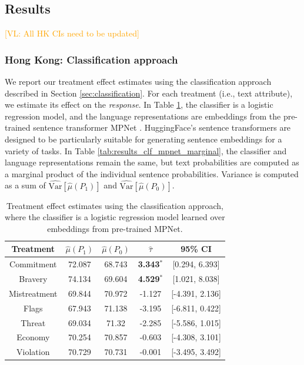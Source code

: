 \documentclass{article}
\newcommand{\vl}[1]{\textcolor{orange}{[VL: #1]}}
\begin{document}
\subsection{Results}

\vl{All HK CIs need to be updated}

\subsubsection{Hong Kong: Classification approach}

We report our treatment effect estimates using the classification approach described in Section \ref{sec:classification}. For each treatment (i.e., text attribute), we estimate its effect on the \textit{response}. In Table \ref{tab:results_clf_mpnet}, the classifier is a logistic regression model, and the language representations are embeddings from the pre-trained sentence transformer MPNet \cite{song2020mpnet}. HuggingFace's sentence transformers are designed to be particularly suitable for generating sentence embeddings for a variety of tasks. In Table \ref{tab:results_clf_mpnet_marginal}, the classifier and language representations remain the same, but text probabilities are computed as a marginal product of the individual sentence probabilities. Variance is computed as a sum of $\widehat{\text{Var}}[\hat{\mu}(P_1)]$ and $\widehat{\text{Var}}[\hat{\mu}(P_0)]$.

\begin{table}[!ht]
    \centering
    \begin{tabular}{c|cccc}
        \toprule
        Treatment & $\hat{\mu}(P_1)$ & $\hat{\mu}(P_0)$ & $\hat{\tau}$ & 95\% CI \\
        \midrule
        Commitment & 72.087 & 68.743 & \textbf{\textcolor{green!50!black}{3.343$^*$}} & [0.294, 6.393] \\
        Bravery & 74.134 & 69.604 & \textbf{\textcolor{green!50!black}{4.529$^*$}} & [1.021, 8.038] \\
        Mistreatment & 69.844 & 70.972 & \textcolor{red!80!black}{-1.127} & [-4.391, 2.136] \\
        Flags & 67.943 & 71.138 & \textcolor{red!80!black}{-3.195} & [-6.811, 0.422] \\
        Threat & 69.034 & 71.32 & \textcolor{red!80!black}{-2.285} & [-5.586, 1.015]  \\
        Economy & 70.254 & 70.857 & \textcolor{red!80!black}{-0.603} & [-4.308, 3.101] \\
        Violation & 70.729 & 70.731 & \textcolor{red!80!black}{-0.001} & [-3.495, 3.492] \\
        \bottomrule
    \end{tabular}
    \caption{Treatment effect estimates using the classification approach, where the classifier is a logistic regression model learned over embeddings from pre-trained MPNet.}
    \label{tab:results_clf_mpnet}
\end{table}
\end{document}
